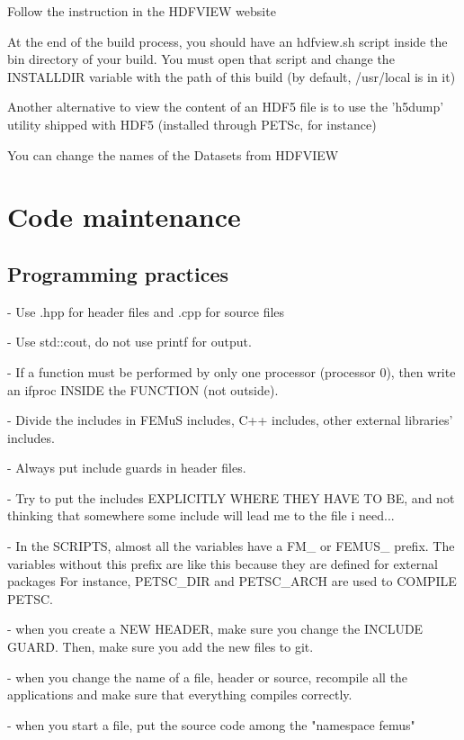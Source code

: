 \documentclass[10pt]{book}
\begin{document}
Follow the instruction in the HDFVIEW website

At the end of the build process, you should have an hdfview.sh script inside the bin directory of your build.
You must open that script and change the INSTALLDIR variable with the path of this build (by default, /usr/local is in it)

Another alternative to view the content of an HDF5 file is to use the 'h5dump' utility shipped with HDF5 (installed through PETSc, for instance)

You can change the names of the Datasets from HDFVIEW
   
 
\part{Code maintenance}

  \chapter{Programming practices}
  
- Use .hpp for header files and .cpp for source files

- Use std::cout, do not use printf for output.

- If a function must be performed by only one processor (processor 0),
then write an ifproc INSIDE the FUNCTION (not outside).

- Divide the includes in 
FEMuS includes,
 C++ includes,
 other external libraries' includes.

- Always put include guards in header files.

- Try to put the includes EXPLICITLY WHERE THEY HAVE TO BE, 
  and not thinking that somewhere some include will lead me to the file i need...

- In the SCRIPTS, almost all the variables have a FM\_ or FEMUS\_ prefix.
 The variables without this prefix are like this because 
 they are defined for external packages
 For instance, PETSC\_DIR and PETSC\_ARCH are used to COMPILE PETSC.
 
 - when you create a NEW HEADER, make sure you change the INCLUDE GUARD.
 Then, make sure you add the new files to git.
 
 - when you change the name of a file, header or source, recompile all the applications
   and make sure that everything compiles correctly.
   
 - when you start a file, put the source code among the "namespace femus"
\end{document}
